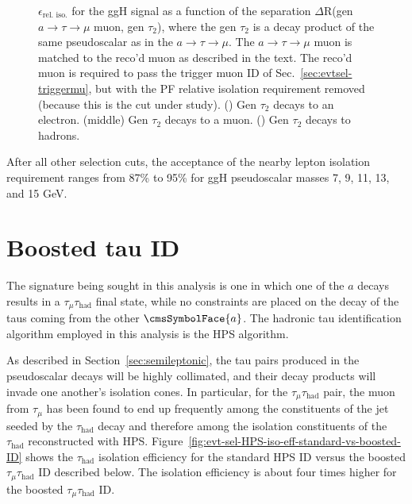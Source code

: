 \begin{figure}[hbtp]
\begin{center}
    \caption{$\epsilon_{\text{rel. iso.}}$ for the ggH signal as a function of the separation $\Delta$R(gen $a\rightarrow\tau\rightarrow\mu$ muon, gen $\tau_{\text{2}}$), where the gen $\tau_{\text{2}}$ is a decay product of the same pseudoscalar as in the $a\rightarrow\tau\rightarrow\mu$.  The $a\rightarrow\tau\rightarrow\mu$ muon is matched to the reco'd muon as described in the text.  The reco'd muon is required to pass the trigger muon ID of Sec.~\ref{sec:evtsel-triggermu}, but with the PF relative isolation requirement removed (because this is the cut under study).  (\cmsLeft) Gen $\tau_{\text{2}}$ decays to an electron.  (middle) Gen $\tau_{\text{2}}$ decays to a muon.  (\cmsRight) Gen $\tau_{\text{2}}$ decays to hadrons.}
    \label{fig:IsoEffVsDR_withFilters}
  \end{center}
\end{figure}

After all other selection cuts, the acceptance of the nearby lepton isolation requirement ranges from 87\% to 95\% for ggH pseudoscalar masses 7, 9, 11, 13, and 15 GeV.

\section{Boosted tau ID\label{sec:evtsel-ditau}}

The signature being sought in this analysis is one in which one of the $a$ decays results in a $\tau_{\mu}\tau_{\text{had}}$ final state, while no constraints are placed on the decay of the taus coming from the other $\cmsSymbolFace{a}$. The hadronic tau identification algorithm employed in this analysis is the HPS algorithm.

As described in Section~\ref{sec:semileptonic}, the tau pairs produced in the pseudoscalar decays will be highly collimated, and their decay products will invade one another's isolation cones. In particular, for the $\tau_{\mu}\tau_{\text{had}}$ pair, the muon from $\tau_{\mu}$ has been found to end up frequently among the constituents of the jet seeded by the $\tau_{\text{had}}$ decay and therefore among the isolation constituents of the $\tau_{\text{had}}$ reconstructed with HPS.  Figure~\ref{fig:evt-sel-HPS-iso-eff-standard-vs-boosted-ID} shows the $\tau_{\text{had}}$ isolation efficiency for the standard HPS ID versus the boosted $\tau_{\mu}\tau_{\text{had}}$ ID described below.  The isolation efficiency is about four times higher for the boosted $\tau_{\mu}\tau_{\text{had}}$ ID.

